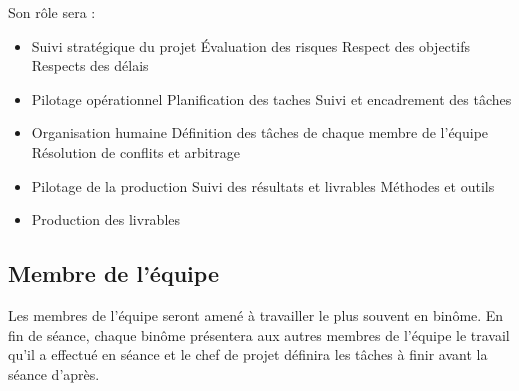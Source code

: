 Son rôle sera :
\begin{itemize}
    \item Suivi stratégique du projet
        \subitem Évaluation des risques
        \subitem Respect des objectifs
        \subitem Respects des délais
    \item Pilotage opérationnel
        \subitem Planification des taches
        \subitem Suivi et encadrement des tâches
    \item Organisation humaine
        \subitem Définition des tâches de chaque membre de l'équipe
        \subitem Résolution de conflits et arbitrage
    \item Pilotage de la production
        \subitem Suivi des résultats et livrables
        \subitem Méthodes et outils
    \item Production des livrables
\end{itemize}

\subsection{Membre de l'équipe}
Les membres de l'équipe seront amené à travailler le plus souvent en binôme. En fin de séance, chaque binôme présentera aux autres membres de l'équipe le travail qu'il a effectué en séance et le chef de projet définira les tâches à finir avant la séance d'après.  

